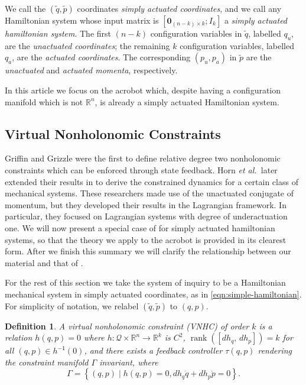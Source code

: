 \documentclass[journal,twoside,web, twocolumn,draftcls]{ieeecolor}
\newtheorem{defn}{Definition} %
\DeclareMathOperator{\Rank}{rank}
\newcommand*{\rank}[1]{\Rank\left(#1\right)}
\newcommand*{\inv}{^\mathsf{-1}}
\newcommand*{\R}{\mathbb{R}}
\newcommand*{\Id}[1]{I_{#1}}
\newcommand*{\Zmat}[1]{\bm{0}_{#1}}
\newcommand*{\etal}{\MakeLowercase{\textit{et al.~}}}
\begin{document}
We call the \((\tilde{q},\tilde{p})\) coordinates
\textit{simply actuated coordinates}, and we call any Hamiltonian system
whose input matrix is \([\Zmat{(n-k)\times k}; \Id{k}]\) a 
\textit{simply actuated hamiltonian system}.
The first \((n-k)\) configuration variables in \(\tilde{q}\), labelled \(q_u\),
are the \textit{unactuated coordinates}; 
the remaining \(k\) configuration variables, labelled \(q_a\), are the
\textit{actuated coordinates}.
The corresponding \((p_u, p_a)\) in \(\tilde{p}\) are the \textit{unactuated}
and \textit{actuated momenta}, respectively.

In this article we focus on the acrobot which, despite having a configuration
manifold which is not \(\R^n\), is already a simply actuated Hamiltonian system.

\subsection{Virtual Nonholonomic Constraints}\label{sec:vnhc-vnhc}

Griffin and Grizzle \cite{nhvc_dynamic_walking} were the first to define
relative degree two nonholonomic constraints which can be enforced
through state feedback.
Horn \etal later extended their results in
\cite{hybrid_zero_dynamics_bipedal_nhvcs} to derive the constrained dynamics for
a certain class of mechanical systems.
These researchers made use of the unactuated conjugate of momentum, but they
developed their results in the Lagrangian framework.
In particular, they focused on Lagrangian systems with degree of underactuation
one.
We will now present a special case of \cite{hybrid_zero_dynamics_bipedal_nhvcs}
for simply actuated hamiltonian systems, so that the theory we apply to the
acrobot is provided in its clearest form.
After we finish this summary we will clarify the relationship between our
material and that of \cite{hybrid_zero_dynamics_bipedal_nhvcs}.

For the rest of this section we take the system of inquiry to be a
Hamiltonian mechanical system in simply actuated coordinates, as in
\eqref{eqn:simple-hamiltonian}.
For simplicity of notation, we relabel \((\tilde{q},\tilde{p})\) to \((q,p)\).

\begin{defn}\label{defn:vnhc}
    A \textit{virtual nonholonomic constraint} (VNHC) \textit{of order \(k\)} is a
    relation \(h(q,p) = 0\) where \(h : \mathcal{Q}\times\R^n \rightarrow \R^k\) is
    \(C^2\), \(\rank{\left[ dh_q,\, dh_p \right]} = k\) for all 
    \((q,p) \in h\inv(0)\), and there exists a feedback controller \(\tau(q,p)\)
    rendering the \textit{constraint manifold} \(\Gamma\) invariant,
    where
    \begin{equation}
        \Gamma = \left\{(q,p) \mid h(q,p) = 0, dh_q \dot{q} + dh_p \dot{p} = 0\right\}
        .
    \end{equation}
\end{defn}
\end{document}

